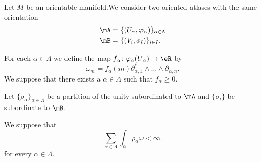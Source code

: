 \begin{proposition}	\label{PROPooDYDPooOWNtfD}
	Let \( M\) be an orientable manifold.We consider two oriented atlases with the same orientation
	\begin{subequations}
		\begin{align}
			\mA & =\{ (U_{\alpha}, \varphi_{\alpha}) \}_{\alpha\in \Lambda} \\
			\mB & =\{ (V_i,\phi_i) \}_{i\in I}.
		\end{align}
	\end{subequations}

	For each \( \alpha\in \Lambda\) we define the map \(f_{\alpha} \colon \varphi_{\alpha}(U_{\alpha}) \to \eR  \) by
	\begin{equation}
		\omega_m=f_{\alpha}(m)\partial_{\alpha,1}^*\wedge\ldots\wedge\partial_{\alpha,n}.
	\end{equation}
	We suppose that there exists a \( \alpha\in \Lambda\) such that \( f_{\alpha}\geq 0\).

	Let \( \{ \rho_{\alpha} \}_{\alpha\in\Lambda}\) be a partition of the unity subordinated to \( \mA\) and \( \{ \sigma_i \}\) be subordinate to \( \mB\).

	We suppose that
	\begin{equation}		\label{EQooUOPVooUCTfof}
		\sum_{\alpha\in\Lambda}\int_{\alpha}\rho_{\alpha}\omega<\infty.
	\end{equation}
	for every \( \alpha\in \Lambda\).


\end{proposition}

